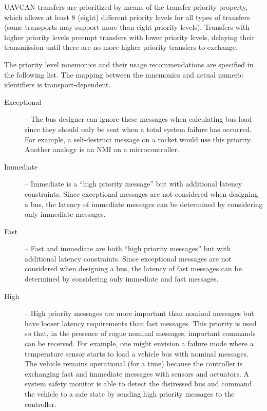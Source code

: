 UAVCAN transfers are prioritized by means of the transfer priority property,
which allows at least 8 (eight) different priority levels for all types of transfers
(some transports may support more than eight priority levels).
Transfers with higher priority levels preempt transfers with lower priority levels,
delaying their transmission until there are no more higher priority transfers to exchange.

The priority level mnemonics and their usage recommendations are specified in the following list.
The mapping between the mnemonics and actual numeric identifiers is transport-dependent.

\begin{description}
    \item[Exceptional] -- The bus designer can ignore these messages when calculating bus load since they
    should only be sent when a total system failure has occurred.
    For example, a self-destruct message on a rocket would use this priority.
    Another analogy is an NMI on a microcontroller.

    \item[Immediate] -- Immediate is a ``high priority message'' but with additional latency constraints.
    Since exceptional messages are not considered when designing a bus, the latency of immediate messages
    can be determined by considering only immediate messages.

    \item[Fast] -- Fast and immediate are both ``high priority messages'' but with additional latency constraints.
    Since exceptional messages are not considered when designing a bus,
    the latency of fast messages can be determined by considering only immediate and fast messages.

    \item[High] -- High priority messages are more important than nominal messages but have looser
    latency requirements than fast messages. This priority is used so that,
    in the presence of rogue nominal messages, important commands can be received.
    For example, one might envision a failure mode where a temperature sensor starts to
    load a vehicle bus with nominal messages.
    The vehicle remains operational (for a time) because the controller is exchanging fast and
    immediate messages with sensors and actuators.
    A system safety monitor is able to detect the distressed bus and command the vehicle to a
    safe state by sending high priority messages to the controller.


\end{description}
